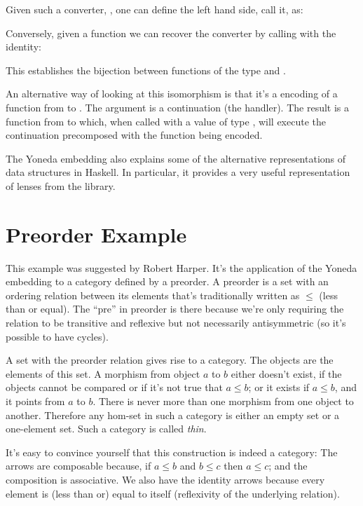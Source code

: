 Given such a converter, , one can define the left hand
side, call it, as:

Conversely, given a function  we can recover the converter
by calling  with the identity:

This establishes the bijection between functions of the type
 and .

An alternative way of looking at this isomorphism is that it's a 
encoding of a function from  to . The argument
 is a continuation (the handler). The result
is a function from  to  which, when called with a
value of type , will execute the continuation precomposed with
the function being encoded.

The Yoneda embedding also explains some of the alternative
representations of data structures in Haskell. In particular, it
provides a 
{very useful representation}
of lenses from the  library.

\section{Preorder Example}

This example was suggested by Robert Harper. It's the application of the
Yoneda embedding to a category defined by a preorder. A preorder is a
set with an ordering relation between its elements that's traditionally
written as $\leqslant$ (less than or equal). The ``pre'' in
preorder is there because we're only requiring the relation to be
transitive and reflexive but not necessarily antisymmetric (so it's
possible to have cycles).

A set with the preorder relation gives rise to a category. The objects
are the elements of this set. A morphism from object $a$ to
$b$ either doesn't exist, if the objects cannot be compared or if
it's not true that $a \leqslant b$; or it exists if
$a \leqslant b$, and it points from $a$ to
$b$. There is never more than one morphism from one object to
another. Therefore any hom-set in such a category is either an empty set
or a one-element set. Such a category is called \emph{thin}.

It's easy to convince yourself that this construction is indeed a
category: The arrows are composable because, if
$a \leqslant b$ and $b \leqslant c$ then
$a \leqslant c$; and the composition is associative. We also
have the identity arrows because every element is (less than or) equal
to itself (reflexivity of the underlying relation).

